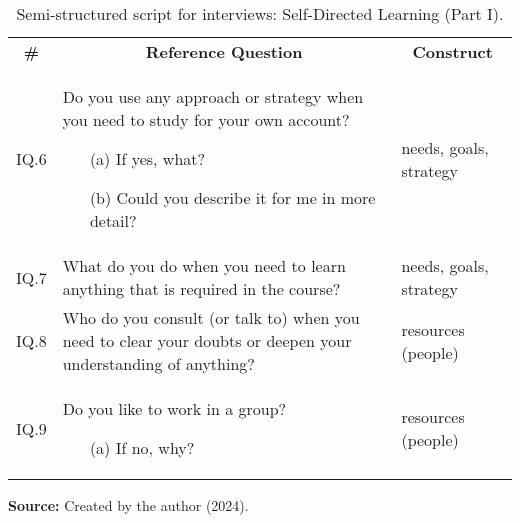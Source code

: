 \begin{table}[ht]
\caption{Semi-structured script for interviews: Self-Directed Learning (Part I).}
\label{tbl:sdl-script-part-i}
\centering
{}
\begin{tabular}{
    p{1cm}
    p{9.5cm}
    p{2.5cm}
}
\hline

\multicolumn{1}{c}{\textbf{\#}} & \multicolumn{1}{c}{\textbf{Reference Question}} & \multicolumn{1}{c}{\textbf{Construct}}\\

\multicolumn{1}{c}{IQ.6} &
Do you use any approach or strategy when you need to study for your own account?
\begin{enumerate}
    \item[(a)] If yes, what?
    \item[(b)] Could you describe it for me in more detail?
\end{enumerate} &
needs, goals, strategy\\

\multicolumn{1}{c}{IQ.7} &
What do you do when you need to learn anything that is required in the course? &
needs, goals, strategy\\

\multicolumn{1}{c}{IQ.8} &
Who do you consult (or talk to) when you need to clear your doubts or deepen your understanding of anything? &
resources (people)\\

\multicolumn{1}{c}{IQ.9} &
Do you like to work in a group?
\begin{enumerate}
    \item[(a)] If no, why?
\end{enumerate} &
resources (people)\\


\hline

\end{tabular}

  \par\medskip\ABNTEXfontereduzida\selectfont\textbf{Source:} Created by the author (2024). \par\medskip
\end{table}

